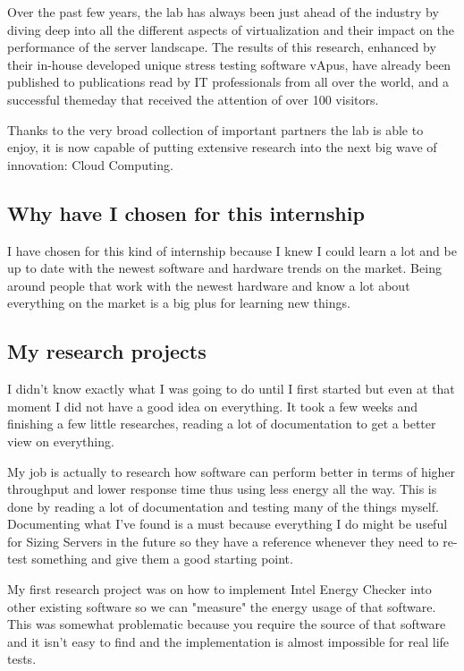 Over the past few years, the lab has always been just ahead of the industry by diving deep into all the different aspects of virtualization
and their impact on the performance of the server landscape. The results of this research, enhanced by their in-house developed unique stress testing 
software vApus, have already been published to publications read by IT professionals from all over the world, 
and a successful themeday that received the attention of over 100 visitors.

Thanks to the very broad collection of important partners the lab is able to enjoy, it is now capable of putting extensive 
research into the next big wave of innovation: Cloud Computing.
\subsection{Why have I chosen for this internship}
I have chosen for this kind of internship because I knew I could learn a lot and be up to date with the newest software and hardware trends on the market.
Being around people that work with the newest hardware and know a lot about everything on the market is a big plus for learning new things.

\subsection{My research projects}
I didn't know exactly what I was going to do until I first started but even at that moment I did not have a good idea on everything. 
It took a few weeks and finishing a few little researches, reading a lot of documentation to get a  better view on everything.

My job is actually to research how software can perform better in terms of higher throughput and lower response time thus using less energy all the way.
This is done by reading a lot of documentation and testing many of the things myself. 
Documenting what I've found is a must because everything I do might be useful for Sizing Servers in the future so they have a reference whenever they need to re-test something and give them a good starting point.

My first research project was on how to implement Intel Energy Checker into other existing software so we can "measure" the energy usage of that software.
This was somewhat problematic because you require the source of that software and it isn't easy to find and the implementation is almost impossible for real life tests.

